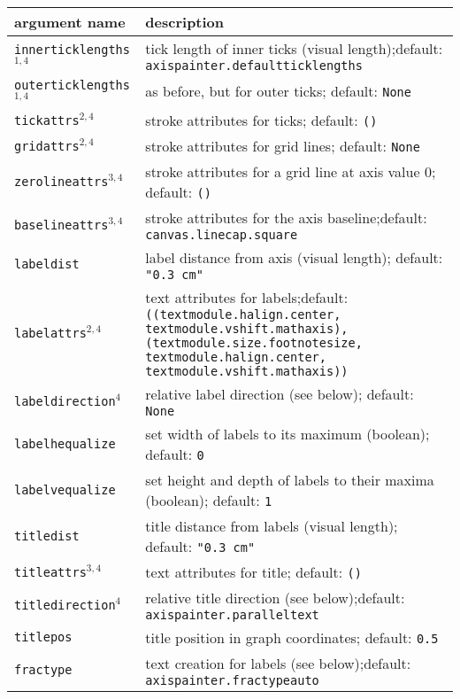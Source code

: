\medskip
\begin{tabularx}{\linewidth}{l>{\raggedright\arraybackslash}X}
argument name&description\\
\hline
\texttt{innerticklengths}$^{1,4}$&tick length of inner ticks (visual length);\newline default: \texttt{axispainter.defaultticklengths}\\
\texttt{outerticklengths}$^{1,4}$&as before, but for outer ticks; default: \texttt{None}\\
\texttt{tickattrs}$^{2,4}$&stroke attributes for ticks; default: \texttt{()}\\
\texttt{gridattrs}$^{2,4}$&stroke attributes for grid lines; default: \texttt{None}\\
\texttt{zerolineattrs}$^{3,4}$&stroke attributes for a grid line at axis value 0; default: \texttt{()}\\
\texttt{baselineattrs}$^{3,4}$&stroke attributes for the axis baseline;\newline default: \texttt{canvas.linecap.square}\\
\texttt{labeldist}&label distance from axis (visual length); default: \texttt{"0.3 cm"}\\
\texttt{labelattrs}$^{2,4}$&text attributes for labels;\newline default: \texttt{((textmodule.halign.center, textmodule.vshift.mathaxis), (textmodule.size.footnotesize, textmodule.halign.center, textmodule.vshift.mathaxis))}\\
\texttt{labeldirection}$^4$&relative label direction (see below); default: \texttt{None}\\
\texttt{labelhequalize}&set width of labels to its maximum (boolean); default: \texttt{0}\\
\texttt{labelvequalize}&set height and depth of labels to their maxima (boolean); default: \texttt{1}\\
\texttt{titledist}&title distance from labels (visual length); default: \texttt{"0.3 cm"}\\
\texttt{titleattrs}$^{3,4}$&text attributes for title; default: \texttt{()}\\
\texttt{titledirection}$^4$&relative title direction (see below);\newline default: \texttt{axispainter.paralleltext}\\
\texttt{titlepos}&title position in graph coordinates; default: \texttt{0.5}\\
\texttt{fractype}&text creation for labels (see below);\newline default: \texttt{axispainter.fractypeauto}\\

\end{tabularx}
